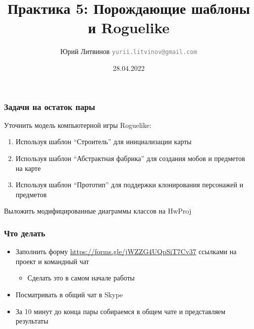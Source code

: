 \documentclass[xetex,mathserif,serif]{beamer}
\title{Практика 5: Порождающие шаблоны и Roguelike}
\author[Юрий Литвинов]{Юрий Литвинов \newline \textcolor{gray}{\small\texttt{yurii.litvinov@gmail.com}}}
\date{28.04.2022}
\begin{document}
    
    \frame{\titlepage}

    \begin{frame}
        \frametitle{Задачи на остаток пары}
        Уточнить модель компьютерной игры Roguelike:

        \begin{enumerate}
            \item Используя шаблон ``Строитель'' для инициализации карты
            \item Используя шаблон ``Абстрактная фабрика'' для создания мобов и предметов на карте
            \item Используя шаблон ``Прототип'' для поддержки клонирования персонажей и предметов
        \end{enumerate}

        Выложить модифицированные диаграммы классов на HwProj
    \end{frame}

    \begin{frame}
        \frametitle{Что делать}
        \begin{itemize}
            \item Заполнить форму \url{https://forms.gle/jWZZG4UQpSiT7Cv37} ссылками на проект и командный чат
            \begin{itemize}
                \item Сделать это в самом начале работы
            \end{itemize}
            \item Посматривать в общий чат в Skype
            \item За 10 минут до конца пары собираемся в общем чате и представляем результаты
        \end{itemize}
    \end{frame}
\end{document}
